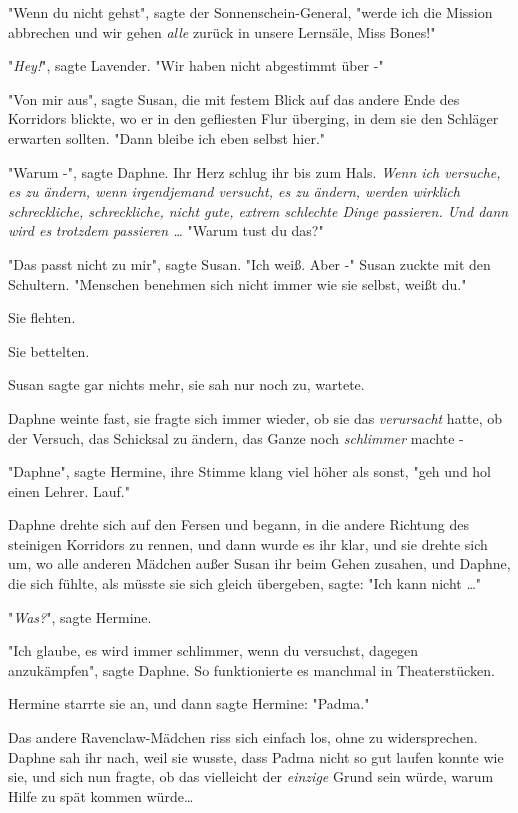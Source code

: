 {"Wenn du nicht gehst", sagte der Sonnenschein-General, "werde ich die Mission abbrechen und wir gehen \emph{alle} zurück in unsere Lernsäle, Miss Bones!"

"\emph{Hey!}", sagte Lavender. "Wir haben nicht abgestimmt über -"

"Von mir aus", sagte Susan, die mit festem Blick auf das andere Ende des Korridors blickte, wo er in den gefliesten Flur überging, in dem sie den Schläger erwarten sollten. "Dann bleibe ich eben selbst hier."

"Warum -", sagte Daphne. Ihr Herz schlug ihr bis zum Hals. \emph{Wenn ich versuche, es zu ändern, wenn irgendjemand versucht, es zu ändern, werden wirklich schreckliche, schreckliche, nicht gute, extrem schlechte Dinge passieren. Und dann wird es} \emph{trotzdem} \emph{passieren …} "Warum tust du das?"

"Das passt nicht zu mir", sagte Susan. "Ich weiß. Aber -" Susan zuckte mit den Schultern. "Menschen benehmen sich nicht immer wie sie selbst, weißt du."

Sie flehten.

Sie bettelten.

Susan sagte gar nichts mehr, sie sah nur noch zu, wartete.

Daphne weinte fast, sie fragte sich immer wieder, ob sie das \emph{verursacht} hatte, ob der Versuch, das Schicksal zu ändern, das Ganze noch \emph{schlimmer} machte -

"Daphne", sagte Hermine, ihre Stimme klang viel höher als sonst, "geh und hol einen Lehrer. Lauf."

Daphne drehte sich auf den Fersen und begann, in die andere Richtung des steinigen Korridors zu rennen, und dann wurde es ihr klar, und sie drehte sich um, wo alle anderen Mädchen außer Susan ihr beim Gehen zusahen, und Daphne, die sich fühlte, als müsste sie sich gleich übergeben, sagte: "Ich kann nicht …"

"\emph{Was?}", sagte Hermine.

"Ich glaube, es wird immer schlimmer, wenn du versuchst, dagegen anzukämpfen", sagte Daphne. So funktionierte es manchmal in Theaterstücken.

Hermine starrte sie an, und dann sagte Hermine: "Padma."

Das andere Ravenclaw-Mädchen riss sich einfach los, ohne zu widersprechen. Daphne sah ihr nach, weil sie wusste, dass Padma nicht so gut laufen konnte wie sie, und sich nun fragte, ob das vielleicht der \emph{einzige} Grund sein würde, warum Hilfe zu spät kommen würde…

}
